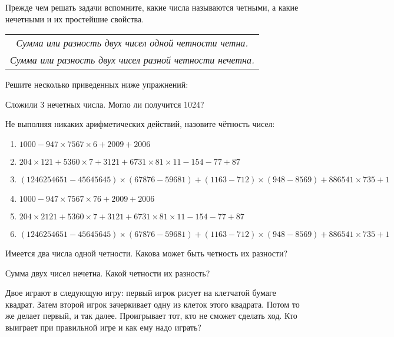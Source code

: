 
Прежде чем решать задачи вспомните, какие числа называются четными, а какие нечетными и их простейшие свойства. 


\begin{table}[h]\centering
	\begin{tabular}{|c|}
		\hline
		\textit{Сумма или разность двух чисел одной четности четна.}\\
		\textit{Сумма или разность двух чисел разной четности нечетна.}\\
		\hline
	\end{tabular}
\end{table}

Решите несколько приведенных ниже упражнений:

\begin{ex}
	Сложили 3 нечетных числа. Могло ли получится 1024?
\end{ex}

\begin{ex} Не выполняя никаких арифметических действий, назовите чётность чисел: 
	\begin{enumerate}
		\item $1000-947\times7567\times6+2009+2006$
		\item $204\times121+5360\times7+3121+6731\times81\times11-154-77+87$ 
		\item $(1246254651-45645645)\times(67876-59681)+(1163-712)\times(948-8569)+886541\times735+1$
		\item$1000-947\times7567\times76+2009+2006$
		\item$204\times2121+5360\times7+3121+6731\times81\times11-154-77+87$
		\item$(1246254651-45645645)\times(67876-59681)+(1163-712)\times(948-8569)+886541\times735+1$
		
	\end{enumerate}
\end{ex}

\begin{ex}
	Имеется два числа одной четности. Какова может быть четность их разности?
\end{ex}

\begin{ex}
	Сумма двух чисел нечетна. Какой четности их разность?
\end{ex}

\begin{ex}
	Двое играют в следующую игру: первый игрок рисует на клетчатой бумаге квадрат. Затем второй игрок зачеркивает одну из клеток этого квадрата. Потом то же делает первый, и так далее. Проигрывает тот, кто не сможет сделать ход. Кто выиграет при правильной игре и как ему надо играть?
\end{ex}

